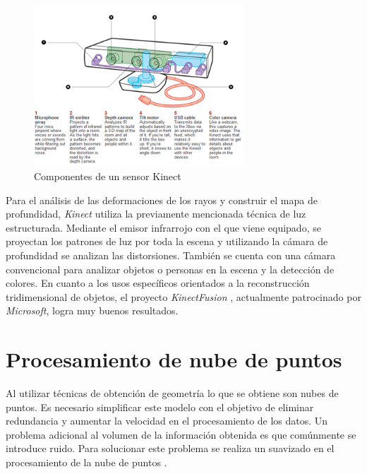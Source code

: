 \begin{figure}[H]
  \centering
    \includegraphics[width=0.7\textwidth]{./Cap6_reconstruccion/kinect.PNG}
  \caption{Componentes de un sensor Kinect}%
  \label{fig:Kinect}
\end{figure}

Para el análisis de las deformaciones de los rayos y construir el mapa de profundidad, \emph{Kinect} utiliza la previamente mencionada técnica de luz estructurada. Mediante el emisor infrarrojo con el que viene equipado, se proyectan los patrones de luz por toda la escena y utilizando la cámara de profundidad se analizan las distorsiones.
También se cuenta con una cámara convencional para analizar objetos o personas en la escena y la detección de colores.
En cuanto a los usos específicos orientados a la reconstrucción tridimensional de objetos, el proyecto \emph{KinectFusion} \cite{KinectFusion}, actualmente patrocinado por \emph{Microsoft}, logra muy buenos resultados.%

\section{Procesamiento de nube de puntos}

Al utilizar técnicas de obtención de geometría lo que se obtiene son nubes de puntos. Es necesario simplificar este modelo con el objetivo de eliminar redundancia y aumentar la velocidad en el procesamiento de los datos. Un problema adicional al volumen de la información obtenida es que comúnmente se introduce ruido. Para solucionar este problema se realiza un suavizado en el procesamiento de la nube de puntos \cite{PCloudSimplify}.


